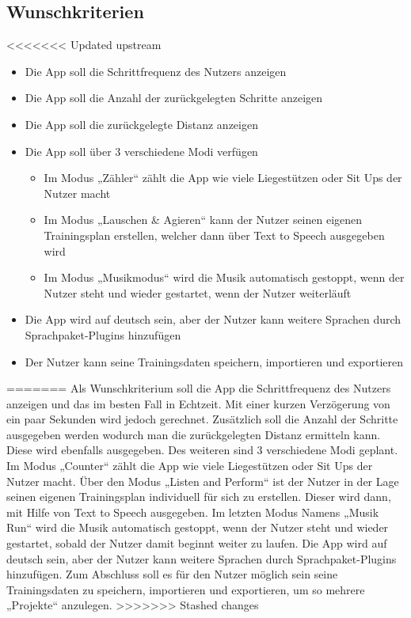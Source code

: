 \documentclass[a4paper,12pt]{article}
\begin{document}
\subsection{Wunschkriterien}
<<<<<<< Updated upstream
  \begin{itemize}
    \item\text Die App soll die Schrittfrequenz des Nutzers anzeigen
    \item\text Die App soll die Anzahl der zurückgelegten Schritte anzeigen
    \item\text Die App soll die zurückgelegte Distanz anzeigen
    \item\text Die App soll über 3 verschiedene Modi verfügen
      \begin{itemize}
        \item\text Im Modus „Zähler“  zählt die App wie viele Liegestützen oder Sit Ups der Nutzer macht
        \item\text  Im Modus „Lauschen \& Agieren“ kann der Nutzer seinen eigenen Trainingsplan erstellen, welcher dann über Text to Speech ausgegeben wird
        \item\text  Im Modus „Musikmodus“ wird die Musik automatisch gestoppt, wenn der Nutzer steht und wieder gestartet, wenn der Nutzer weiterläuft
      \end{itemize}
    \item\text Die App wird auf deutsch sein, aber der Nutzer kann weitere Sprachen durch Sprachpaket-Plugins hinzufügen
    \item\text Der Nutzer kann seine Trainingsdaten speichern, importieren und exportieren
  \end{itemize}
=======
Als Wunschkriterium soll die App die Schrittfrequenz des Nutzers anzeigen und das im besten Fall in \Gls{Echtzeit}. Mit einer kurzen Verzögerung von ein paar Sekunden wird jedoch gerechnet. Zusätzlich soll die Anzahl der Schritte ausgegeben werden wodurch man die zurückgelegten Distanz ermitteln kann. Diese wird ebenfalls ausgegeben. Des weiteren sind 3 verschiedene Modi geplant. Im Modus „Counter“ zählt die App wie viele Liegestützen oder Sit Ups der Nutzer macht. Über den Modus „Listen and Perform“ ist der Nutzer in der Lage seinen eigenen Trainingsplan individuell für sich zu erstellen. Dieser wird dann, mit Hilfe von Text to Speech ausgegeben. Im letzten Modus Namens „Musik Run“ wird die Musik automatisch gestoppt, wenn der Nutzer steht und wieder gestartet, sobald der Nutzer damit beginnt weiter zu laufen. Die App wird auf deutsch sein, aber der Nutzer kann weitere Sprachen durch Sprachpaket-Plugins hinzufügen. Zum Abschluss soll es für den Nutzer möglich sein seine Trainingsdaten zu speichern, importieren und exportieren, um so mehrere „Projekte“ anzulegen.
>>>>>>> Stashed changes
\end{document}
